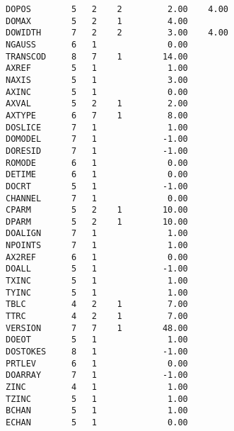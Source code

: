 \begin{verbatim}
DOPOS        5   2    2         2.00    4.00
DOMAX        5   2    1         4.00
DOWIDTH      7   2    2         3.00    4.00
NGAUSS       6   1              0.00
TRANSCOD     8   7    1        14.00
AXREF        5   1              1.00
NAXIS        5   1              3.00
AXINC        5   1              0.00
AXVAL        5   2    1         2.00
AXTYPE       6   7    1         8.00
DOSLICE      7   1              1.00
DOMODEL      7   1             -1.00
DORESID      7   1             -1.00
ROMODE       6   1              0.00
DETIME       6   1              0.00
DOCRT        5   1             -1.00
CHANNEL      7   1              0.00
CPARM        5   2    1        10.00
DPARM        5   2    1        10.00
DOALIGN      7   1              1.00
NPOINTS      7   1              1.00
AX2REF       6   1              0.00
DOALL        5   1             -1.00
TXINC        5   1              1.00
TYINC        5   1              1.00
TBLC         4   2    1         7.00
TTRC         4   2    1         7.00
VERSION      7   7    1        48.00
DOEOT        5   1              1.00
DOSTOKES     8   1             -1.00
PRTLEV       6   1              0.00
DOARRAY      7   1             -1.00
ZINC         4   1              1.00
TZINC        5   1              1.00
BCHAN        5   1              1.00
ECHAN        5   1              0.00
\end{verbatim}
